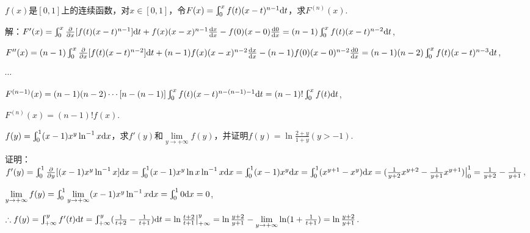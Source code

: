 \documentclass[12pt,UTF8]{ctexart}
\newcommand\LIM[2]{\lim\limits_{#1\rightarrow#2}}
\newcommand{\Int}[4]{\varint\nolimits_{#1}^{#2}#3\mathrm d#4}
\newcommand{\md}[1]{\mathrm d#1}
\begin{document}
\begin{enumerate}
$f(x)$是$[0,1]$上的连续函数，对$x\in[0,1]$，令$F(x)=\Int0x{f(t)(x-t)^{n-1}}t$，求$F^{(n)}(x)$.

解：$F'(x)=\Int0x{\frac\partial{\partial x}[f(t)(x-t)^{n-1}]}t+f(x)(x-x)^{n-1}\frac{\md x}{\md x}-f(0)(x-0)\frac{\md0}{\md x}\\
=(n-1)\Int0x{f(t)(x-t)^{n-2}}t$,

$F''(x)=(n-1)\Int0x{\frac\partial{\partial x}[f(t)(x-t)^{n-2}]}t+(n-1)f(x)(x-x)^{n-2}\frac{\md x}{\md x}-(n-1)f(0)(x-0)^{n-2}\frac{\md0}{\md x}\\
=(n-1)(n-2)\Int0x{f(t)(x-t)^{n-3}}t$,

$\cdots$

$F^{(n-1)}(x)=(n-1)(n-2)\cdots[n-(n-1)]\Int0x{f(t)(x-t)^{n-(n-1)-1}}t=(n-1)!\Int0x{f(t)}t$,

$F^{(n)}(x)=(n-1)!f(x)$.

$f(y)=\Int01{(x-1)x^y\ln^{-1}x}x$，求$f'(y)$和$\LIM y{+\infty}f(y)$，并证明$f(y)=\ln\frac{2+y}{1+y}(y>-1)$.

证明：$f'(y)=\Int01{\frac\partial{\partial y}[(x-1)x^y\ln^{-1}x]}x=\Int01{(x-1)x^y\ln x\ln^{-1}x}x=\Int01{(x-1)x^y}x\\
=\Int01{(x^{y+1}-x^y)}x=(\frac1{y+2}x^{y+2}-\frac1{y+1}x^{y+1})\big|_0^1=\frac1{y+2}-\frac1{y+1}$,

$\LIM y{+\infty}f(y)=\Int01{\LIM y{+\infty}(x-1)x^y\ln^{-1}x}x=\Int010x=0$,

$\therefore f(y)=\Int{+\infty}y{f'(t)}t=\Int{+\infty}y{(\frac1{t+2}-\frac1{t+1})}t=\ln\frac{t+2}{t+1}\big|_{+\infty}^y=\ln\frac{y+2}{y+1}-\LIM y{+\infty}\ln(1+\frac1{t+1})\\
=\ln\frac{y+2}{y+1}$.
\end{enumerate}
\end{document}
